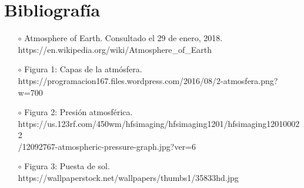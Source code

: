 \section{Bibliografía}
\begin{itemize}
\item[$\circ$]
Atmosphere of Earth. Consultado el 29 de enero, 2018.
\\ https://en.wikipedia.org/wiki/Atmosphere\_of\_Earth
\\
\item[$\circ$]
Figura 1: Capas de la atmósfera.
\\ https://programacion167.files.wordpress.com/2016/08/2-atmosfera.png?w=700
\\
\item[$\circ$]
Figura 2: Presión atmosférica.
\\ https://us.123rf.com/450wm/hfsimaging/hfsimaging1201/hfsimaging120100022
\\/12092767-atmospheric-pressure-graph.jpg?ver=6
\\
\item[$\circ$]
Figura 3: Puesta de sol.
\\ https://wallpaperstock.net/wallpapers/thumbs1/35833hd.jpg

\end{itemize}


